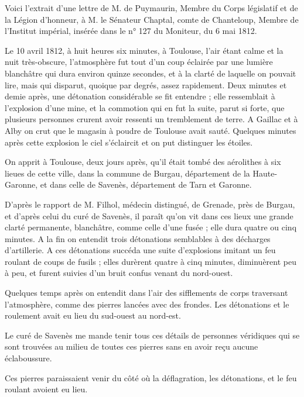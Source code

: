 \documentclass[a4paper, 12pt, oneside, french]{article}
\begin{document}
Voici l'extrait d'une lettre de M. de Puymaurin, Membre du Corps législatif et de la Légion d'honneur, à M. le Sénateur Chaptal, comte de Chanteloup, Membre de l'Institut impérial, insérée dans le n° 127 du Moniteur, du 6 mai 1812.

\og Le 10 avril 1812, à huit heures six minutes, à Toulouse, l'air étant calme et la nuit très-obscure, l'atmosphère fut tout d'un coup éclairée par une lumière blanchâtre qui dura environ quinze secondes, et à la clarté de laquelle on pouvait lire, mais qui disparut, quoique par degrés, assez rapidement. Deux minutes et demie après, une détonation considérable se fit entendre ; elle ressemblait à l'explosion d'une mine, et la commotion qui en fut la suite, parut si forte, que plusieurs personnes crurent avoir ressenti un tremblement de terre. A Gaillac et à Alby on crut que le magasin à poudre de Toulouse avait sauté. Quelques minutes après cette explosion le ciel s'éclaircit et on put distinguer les étoiles. \fg

\og On apprit à Toulouse, deux jours après, qu'il était tombé des aérolithes à six lieues de cette ville, dans la commune de Burgau, département de la Haute-Garonne, et dans celle de Savenès, département de Tarn et Garonne. \fg

\og D'après le rapport de M. Filhol, médecin distingué, de Grenade, près de Burgau, et d'après celui du curé de Savenès, il paraît qu'on vit dans ces lieux une grande clarté permanente, blanchâtre, comme celle d'une fusée ; elle dura quatre ou cinq minutes. A la fin on entendit trois détonations semblables à des décharges d'artillerie. A ces détonations succéda une suite d'explosions imitant un feu roulant de coups de fusils ; elles durèrent quatre à cinq minutes, diminuèrent peu à peu, et furent suivies d'un bruit confus venant du nord-ouest. \fg

\og Quelques temps après on entendit dans l'air des sifflements de corps traversant l'atmosphère, comme des pierres lancées avec des frondes. Les détonations et le roulement avait eu lieu du sud-ouest au nord-est. \fg

\og Le curé de Savenès me mande tenir tous ces détails de personnes véridiques qui se sont trouvées au milieu de toutes ces pierres sans en avoir reçu aucune éclaboussure. \fg

\og Ces pierres paraissaient venir du côté où la déflagration, les détonations, et le feu roulant avoient eu lieu. \fg
\end{document}
